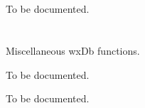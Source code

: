 \section{}\label{wxdbtableinf}

To be documented.

\section{}\label{wxdbfunctions}

Miscellaneous wxDb functions.

\label{wxdbgetconnection}

To be documented.

\label{wxdbsqllog}

To be documented.

